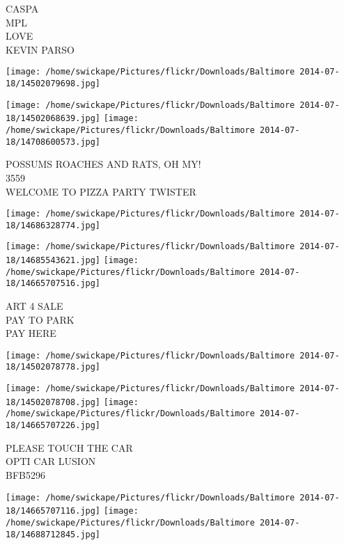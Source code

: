 \documentclass[10pt,letterpaper]{article}
\begin{document}
CASPA\\
MPL\\
LOVE\\
KEVIN PARSO\\
\pagebreak

\texttt{[image: /home/swickape/Pictures/flickr/Downloads/Baltimore 2014-07-18/14502079698.jpg]}

\vspace{0.25in}
\texttt{[image: /home/swickape/Pictures/flickr/Downloads/Baltimore 2014-07-18/14502068639.jpg]}
\texttt{[image: /home/swickape/Pictures/flickr/Downloads/Baltimore 2014-07-18/14708600573.jpg]}

POSSUMS ROACHES AND RATS, OH MY!\\
3559\\
WELCOME TO PIZZA PARTY TWISTER\\
\pagebreak

\texttt{[image: /home/swickape/Pictures/flickr/Downloads/Baltimore 2014-07-18/14686328774.jpg]}

\vspace{0.25in}
\texttt{[image: /home/swickape/Pictures/flickr/Downloads/Baltimore 2014-07-18/14685543621.jpg]}
\texttt{[image: /home/swickape/Pictures/flickr/Downloads/Baltimore 2014-07-18/14665707516.jpg]}

ART 4 SALE\\
PAY TO PARK\\
PAY HERE\\
\pagebreak

\texttt{[image: /home/swickape/Pictures/flickr/Downloads/Baltimore 2014-07-18/14502078778.jpg]}

\vspace{0.25in}
\texttt{[image: /home/swickape/Pictures/flickr/Downloads/Baltimore 2014-07-18/14502078708.jpg]}
\texttt{[image: /home/swickape/Pictures/flickr/Downloads/Baltimore 2014-07-18/14665707226.jpg]}

PLEASE TOUCH THE CAR\\
OPTI CAR LUSION\\
BFB5296\\
\pagebreak

\texttt{[image: /home/swickape/Pictures/flickr/Downloads/Baltimore 2014-07-18/14665707116.jpg]}
\texttt{[image: /home/swickape/Pictures/flickr/Downloads/Baltimore 2014-07-18/14688712845.jpg]}
\end{document}
